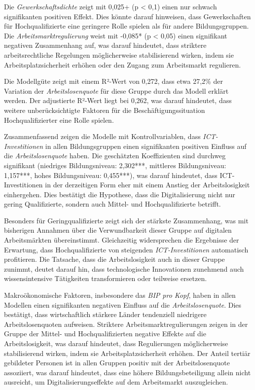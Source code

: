 Die \textit{Gewerkschaftsdichte} zeigt mit 0,025+ (p < 0,1) einen nur schwach signifikanten 
positiven Effekt. Dies könnte darauf hinweisen, dass Gewerkschaften für Hochqualifizierte 
eine geringere Rolle spielen als für andere Bildungsgruppen. Die 
\textit{Arbeitsmarktregulierung} weist mit -0,085* (p < 0,05) einen signifikant negativen 
Zusammenhang auf, was darauf hindeutet, dass striktere arbeitsrechtliche Regelungen 
möglicherweise stabilisierend wirken, indem sie Arbeitsplatzsicherheit erhöhen oder den 
Zugang zum Arbeitsmarkt regulieren.

Die Modellgüte zeigt mit einem R²-Wert von 0,272, dass etwa 27,2\% der Variation der 
\textit{Arbeitslosenquote} für diese Gruppe durch das Modell erklärt werden. Der adjustierte 
R²-Wert liegt bei 0,262, was darauf hindeutet, dass weitere unberücksichtigte Faktoren für 
die Beschäftigungssituation Hochqualifizierter eine Rolle spielen.

Zusammenfassend zeigen die Modelle mit Kontrollvariablen, dass 
\textit{\ac{ICT}-Investitionen} in allen Bildungsgruppen einen signifikanten positiven 
Einfluss auf die \textit{Arbeitslosenquote} haben. Die geschätzten Koeffizienten sind 
durchweg signifikant (niedriges Bildungsniveau: 2,302***, mittleres Bildungsniveau: 
1,157***, hohes Bildungsniveau: 0,455***), was darauf hindeutet, dass 
\ac{ICT}-Investitionen in der derzeitigen Form eher mit einem Anstieg der Arbeitslosigkeit 
einhergehen. Dies bestätigt die Hypothese, dass die Digitalisierung nicht nur gering 
Qualifizierte, sondern auch Mittel- und Hochqualifizierte betrifft.

Besonders für Geringqualifizierte zeigt sich der stärkste Zusammenhang, was mit bisherigen 
Annahmen über die Verwundbarkeit dieser Gruppe auf digitalen Arbeitsmärkten übereinstimmt. 
Gleichzeitig widersprechen die Ergebnisse der Erwartung, dass Hochqualifizierte von 
steigenden \textit{\ac{ICT}-Investitionen} automatisch profitieren. Die Tatsache, dass die 
Arbeitslosigkeit auch in dieser Gruppe zunimmt, deutet darauf hin, dass technologische 
Innovationen zunehmend auch wissensintensive Tätigkeiten transformieren oder teilweise 
ersetzen.

Makroökonomische Faktoren, insbesondere das \textit{\ac{BIP} pro Kopf}, haben in allen 
Modellen einen signifikanten negativen Einfluss auf die \textit{Arbeitslosenquote}. Dies 
bestätigt, dass wirtschaftlich stärkere Länder tendenziell niedrigere Arbeitslosenquoten 
aufweisen. Striktere Arbeitsmarktregulierungen zeigen in der Gruppe der Mittel- und 
Hochqualifizierten negative Effekte auf die Arbeitslosigkeit, was darauf hindeutet, dass 
Regulierungen möglicherweise stabilisierend wirken, indem sie Arbeitsplatzsicherheit 
erhöhen. Der Anteil tertiär gebildeter Personen ist in allen Gruppen positiv mit der 
Arbeitslosenquote assoziiert, was darauf hindeutet, dass eine höhere Bildungsbeteiligung 
allein nicht ausreicht, um Digitalisierungseffekte auf dem Arbeitsmarkt auszugleichen.

